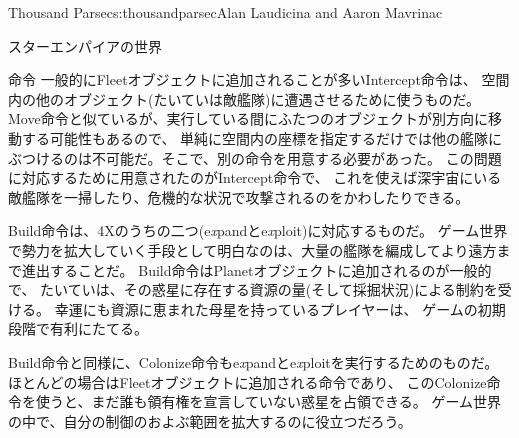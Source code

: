 \begin{aosachapter}{Thousand Parsec}{s:thousandparsec}{Alan Laudicina and Aaron Mavrinac}
\begin{aosasect1}{スターエンパイアの世界}
\begin{aosasect2}{命令}
一般的にFleetオブジェクトに追加されることが多いIntercept命令は、
空間内の他のオブジェクト(たいていは敵艦隊)に遭遇させるために使うものだ。
Move命令と似ているが、実行している間にふたつのオブジェクトが別方向に移動する可能性もあるので、
単純に空間内の座標を指定するだけでは他の艦隊にぶつけるのは不可能だ。そこで、別の命令を用意する必要があった。
この問題に対応するために用意されたのがIntercept命令で、
これを使えば深宇宙にいる敵艦隊を一掃したり、危機的な状況で攻撃されるのをかわしたりできる。

Build命令は、4Xのうちの二つ(e\emph{x}pandとe\emph{x}ploit)に対応するものだ。
ゲーム世界で勢力を拡大していく手段として明白なのは、大量の艦隊を編成してより遠方まで進出することだ。
Build命令はPlanetオブジェクトに追加されるのが一般的で、
たいていは、その惑星に存在する資源の量(そして採掘状況)による制約を受ける。
幸運にも資源に恵まれた母星を持っているプレイヤーは、
ゲームの初期段階で有利にたてる。

Build命令と同様に、Colonize命令もe\emph{x}pandとe\emph{x}ploitを実行するためのものだ。
ほとんどの場合はFleetオブジェクトに追加される命令であり、
このColonize命令を使うと、まだ誰も領有権を宣言していない惑星を占領できる。
ゲーム世界の中で、自分の制御のおよぶ範囲を拡大するのに役立つだろう。


\end{aosasect2}
\end{aosasect1}
\end{aosachapter}
